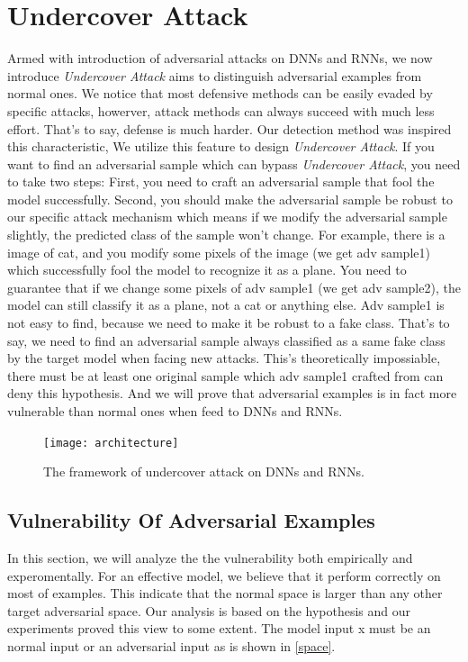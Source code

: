 \documentclass{article}
\begin{document}
\section{Undercover Attack}

Armed with introduction of adversarial attacks on DNNs and RNNs, we now introduce \emph{Undercover Attack} aims to distinguish adversarial examples from normal ones. We notice that most defensive methods can be easily evaded by specific attacks, howerver, attack methods can always succeed with much less effort. That's to say, defense is much harder. Our detection method was inspired this characteristic, We utilize this feature to design \emph{Undercover Attack}. If you want to find an adversarial sample which can bypass \emph{Undercover Attack}, you need to take two steps: First, you need to craft an adversarial sample that fool the model successfully. Second, you should make the adversarial sample be robust to our specific attack mechanism which means if we modify the adversarial sample slightly, the predicted class of the sample won't change. For example, there is a image of cat, and you modify some pixels of the image (we get adv sample1) which successfully fool the model to recognize it as a plane. You need to guarantee that if we change some pixels of adv sample1 (we get adv sample2), the model can still classify it as a plane, not a cat or anything else. Adv sample1 is not easy to find, because we need to make it be robust to a fake class. That's to say, we need to find an adversarial sample always classified as a same fake class by the target model when facing new attacks. This's theoretically impossiable, there must be at least one original sample which adv sample1 crafted from can deny this hypothesis. And we will prove that adversarial examples is in fact more vulnerable than normal ones when feed to DNNs and RNNs.

\begin{figure}[ht]
  \centerline{\texttt{[image: architecture]}}
  \caption{The framework of undercover attack on DNNs and RNNs.}
  \label{framework}
\end{figure}

\subsection{Vulnerability Of Adversarial Examples}

In this section, we will analyze the the vulnerability both empirically and experomentally. For an effective model, we believe that it perform correctly on most of examples. This indicate that the normal space is larger than any other target adversarial space. Our analysis is based on the hypothesis and our experiments proved this view to some extent. The model input x must be an normal input or an adversarial input as is shown in \ref{space}.
\end{document}
